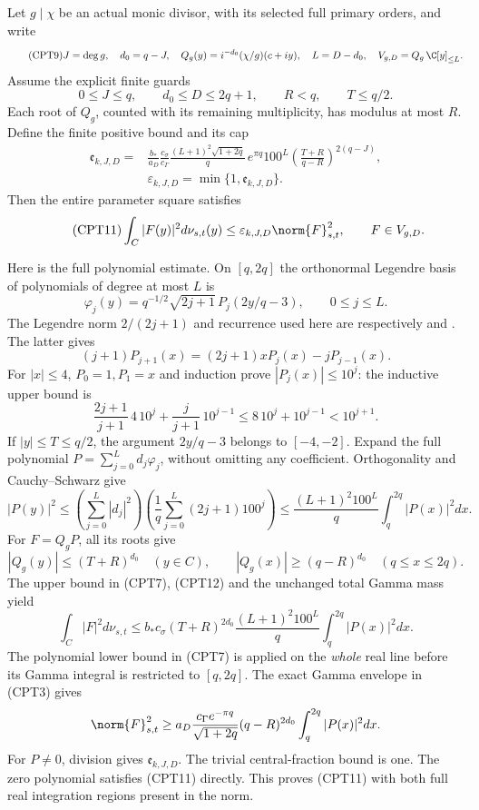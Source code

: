 Let \(g\mid\chi\) be an actual monic divisor, with its selected full
primary orders, and write
\begin{equation}\tag{CPT9}
 J=\deg g,\quad d_0=q-J,\quad
 Q_g(y)=i^{-d_0}(\chi/g)(c+iy),\quad
 L=D-d_0,\quad
 V_{g,D}=Q_g\,\C[y]_{\le L}.
\end{equation}
Assume the explicit finite guards
\[
 0\le J\le q,\qquad d_0\le D\le2q+1,\qquad
 R<q,\qquad T\le q/2.
\]
Each root of \(Q_g\), counted with its remaining multiplicity, has
modulus at most \(R\).  Define the finite positive bound and its cap
\begin{equation}\tag{CPT10}
\begin{split}
 \mathfrak e_{k,J,D}
 ={}&\frac{b_*}{a_D}\frac{c_\sigma}{c_\Gamma}
 \frac{(L+1)^2\sqrt{1+2q}}q\,e^{\pi q}100^L
 \left(\frac{T+R}{q-R}\right)^{2(q-J)},\\
 &\varepsilon_{k,J,D}=\min\{1,\mathfrak e_{k,J,D}\}.
\end{split}
\end{equation}
Then the entire parameter square satisfies
\begin{equation}\tag{CPT11}
 \int_C |F(y)|^2d\nu_{s,t}(y)
 \le\varepsilon_{k,J,D}\norm{F}_{s,t}^2,
 \qquad F\in V_{g,D}.
\end{equation}

Here is the full polynomial estimate.  On \([q,2q]\) the
orthonormal Legendre basis of polynomials of degree at most \(L\)
is
\[
 \varphi_j(y)=q^{-1/2}\sqrt{2j+1}\,
 P_j(2y/q-3),\qquad 0\le j\le L.
\]
The Legendre norm \(2/(2j+1)\) and recurrence used here are
respectively \cite[Table 18.3.1]{cpt:dlmfLegendreNorm} and
\cite[Table 18.9.1]{cpt:dlmfLegendreRec}.  The latter gives
\[
 (j+1)P_{j+1}(x)=(2j+1)xP_j(x)-jP_{j-1}(x).
\]
For \(|x|\le4\), \(P_0=1,P_1=x\) and induction prove
\(|P_j(x)|\le10^j\): the inductive upper bound is
\[
 \frac{2j+1}{j+1}\,4\,10^j+
 \frac{j}{j+1}\,10^{j-1}
 \le8\,10^j+10^{j-1}<10^{j+1}.
\]
If \(|y|\le T\le q/2\), the argument \(2y/q-3\) belongs to
\([-4,-2]\).  Expand the full polynomial
\(P=\sum_{j=0}^L d_j\varphi_j\), without omitting any coefficient.
Orthogonality and Cauchy--Schwarz give
\begin{equation}\tag{CPT12}
 |P(y)|^2\le
 \left(\sum_{j=0}^L|d_j|^2\right)
 \left(\frac1q\sum_{j=0}^L(2j+1)100^j\right)
 \le\frac{(L+1)^2 100^L}{q}
                       \int_q^{2q}|P(x)|^2dx .
\end{equation}
For \(F=Q_gP\), all its roots give
\[
 |Q_g(y)|\le(T+R)^{d_0}\quad(y\in C),\qquad
 |Q_g(x)|\ge(q-R)^{d_0}\quad(q\le x\le2q).
\]
The upper bound in (CPT7), (CPT12) and the unchanged total Gamma
mass yield
\[
 \int_C|F|^2d\nu_{s,t}
 \le b_*c_\sigma(T+R)^{2d_0}
       \frac{(L+1)^2 100^L}{q}\int_q^{2q}|P(x)|^2dx.
\]
The polynomial lower bound in (CPT7) is applied on the \emph{whole}
real line before its Gamma integral is restricted to \([q,2q]\).
The exact Gamma envelope in (CPT3) gives
\[
 \norm{F}_{s,t}^2
 \ge a_D\frac{c_\Gamma e^{-\pi q}}{\sqrt{1+2q}}
           (q-R)^{2d_0}\int_q^{2q}|P(x)|^2dx .
\]
For \(P\ne0\), division gives \(\mathfrak e_{k,J,D}\).
The trivial central-fraction bound is one.  The zero polynomial
satisfies (CPT11) directly.  This proves (CPT11) with both full
real integration regions present in the norm.

